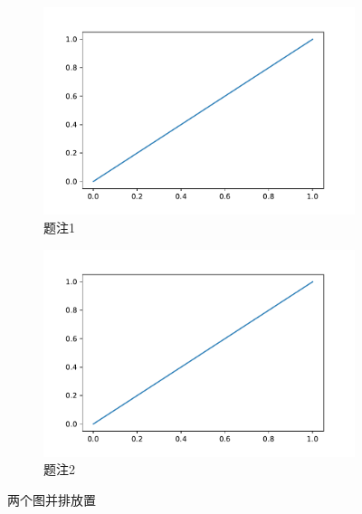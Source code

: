\begin{figure}[H]
    \centering
    \begin{subfigure}{0.45\textwidth}
        \includegraphics[width=\textwidth]{./asset/figure.pdf}
        \caption{题注1}
    \end{subfigure}
    \begin{subfigure}{0.45\textwidth}
        \includegraphics[width=\textwidth]{./asset/figure.pdf}
        \caption{题注2}
    \end{subfigure}
    \caption{两个图并排放置}\label{sub_cap}
  \end{figure}